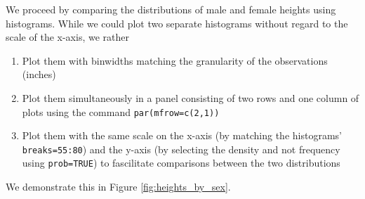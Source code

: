 \documentclass{article}\usepackage[]{graphicx}\usepackage[]{color}
\begin{document}
We proceed by comparing the distributions of male and female heights using histograms.  While we could plot two separate histograms without regard to the scale of the x-axis, we rather

\begin{enumerate}
\item Plot them with binwidths matching the granularity of the observations (inches)
\item Plot them simultaneously in a panel consisting of two rows and one column of plots using the command \verb#par(mfrow=c(2,1))#
\item Plot them with the same scale on the x-axis (by matching the histograms' \verb#breaks=55:80#) and the y-axis (by selecting the density and not frequency using \verb#prob=TRUE#) to fascilitate comparisons between the two distributions
\end{enumerate}

We demonstrate this in Figure \ref{fig:heights_by_sex}.
\end{document}

